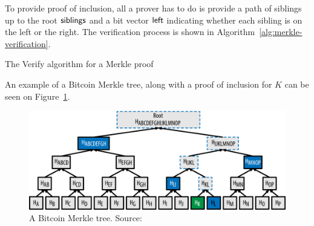 To provide proof of inclusion, all a prover has to do is provide a path of
siblings up to the root $\sf{siblings}$ and a bit vector $\sf{left}$ indicating
whether each sibling is on the left or the right. The verification process is
shown in Algorithm~\ref{alg:merkle-verification}.

\begin{algorithm}[H]
  \caption{\label{alg:merkle-verification}The \textsf{Verify} algorithm
    for a Merkle proof}
    \begin{algorithmic}[1]
              \Else
              \EndIf
            \EndWhile
            \State{}
        \EndFunction
    \end{algorithmic}
\end{algorithm}

An example of a Bitcoin Merkle tree, along with a proof of inclusion for $K$ can be seen on Figure~\ref{fig:merkletree}.

\begin{figure}
  \centering
  \includegraphics[width=0.9\columnwidth,keepaspectratio]{figures/merkle-tree-proof.png}
  \caption{A Bitcoin Merkle tree. Source:~\cite{mastering}}
  \label{fig:merkletree}
\end{figure}

